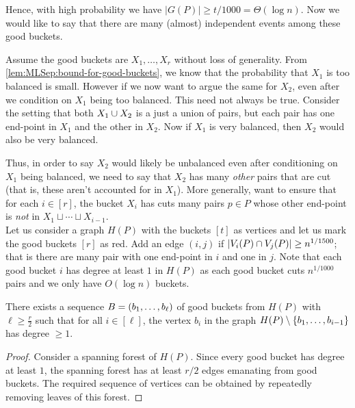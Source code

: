 Hence, with high probability we have $|G(P)| \geq t/1000 = \Theta(\log n)$. Now we would like to say that there are many (almost) independent events among these good buckets. 

Assume the good buckets are $X_1,\ldots,X_{r}$ without loss of generality. From \autoref{lem:MLSep:bound-for-good-buckets}, we know that the probability that $X_1$ is too balanced is small. However if we now want to argue the same for $X_2$, even after we condition on $X_1$ being too balanced. This need not always be true. Consider the setting that both $X_1 \cup X_2$ is a just a union of pairs, but each pair has one end-point in $X_1$ and the other in $X_2$. Now if $X_1$ is very balanced, then $X_2$ would also be very balanced.

Thus, in order to say $X_2$ would likely be unbalanced even after conditioning on $X_1$ being balanced, we need to say that $X_2$ has many \emph{other} pairs that are cut (that is, these aren't accounted for in $X_1$). More generally, want to ensure that for each $i \in [r]$, the bucket $X_i$ has cuts many pairs $p \in P$ whose other end-point is \emph{not} in $X_1 \sqcup \cdots \sqcup X_{i-1}$. \\

Let us consider a graph $H(P)$ with the buckets $[t]$ as vertices and let us mark the good buckets $[r]$ as red. Add an edge $(i,j)$ if $\left|V_i(P) \cap V_j(P)\right| \geq n^{1/1500}$; that is there are many pair with one end-point in $i$ and one in $j$. Note that each good bucket $i$ has degree at least $1$ in $H(P)$ as each good bucket cuts $n^{1/1000}$ pairs and we only have $O(\log n)$ buckets. 

\begin{lemma}
\label{lem:halfVerticesIndep}
There exists a sequence $B=\left(b_1,\ldots,b_\ell\right)$ of good buckets from $H(P)$ with  $\ell \geq \frac{r}{2}$ such that for all $i \in [\ell]$, the vertex $b_i$ in the graph $H(P) \setminus \left\{b_1,\ldots, b_{i-1}\right\}$ has degree $\geq 1$.
\end{lemma}
\begin{proof}
  Consider a spanning forest of $H(P)$. Since every good bucket has degree at least $1$, the spanning forest has at least $r/2$ edges emanating from good buckets. The required sequence of vertices can be obtained by repeatedly removing leaves of this forest. 
\end{proof}

